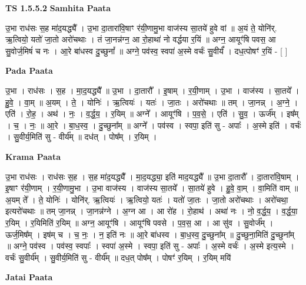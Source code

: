 \documentclass[17pt]{extarticle}
\begin{document}
\textbf{TS 1.5.5.2 } \newline
\textbf{Samhita Paata} \newline

उ॒भा राध॑सः स॒ह मा॑द॒यद्ध्यै᳚ । उ॒भा दा॒तारा॑वि॒षाꣳ र॑यी॒णामु॒भा वाज॑स्य सा॒तये॑ हुवे वां ॥ अ॒यं ते॒ योनि॑र्. ऋ॒त्वियो॒ यतो॑ जा॒तो अरो॑चथाः । तं जा॒नन्न॑ग्न॒ आ रो॒हाथा॑ नो वर्द्धया र॒यिं ॥ अग्न॒ आयूꣳ॑षि पवस॒ आ सु॒वोर्ज॒मिषं॑ च नः । आ॒रे बा॑धस्व दु॒च्छुनां᳚ ॥ अग्ने॒ पव॑स्व॒ स्वपा॑ अ॒स्मे वर्चः॑ सु॒वीर्यं᳚ । दध॒त्पोषꣳ॑ र॒यिं - [ ] \newline

\textbf{Pada Paata} \newline

उ॒भा । राध॑सः । स॒ह । मा॒द॒यद्ध्यै᳚ ॥ उ॒भा । दा॒तारौ᳚ । इ॒षाम् । र॒यी॒णाम् । उ॒भा । वाज॑स्य । सा॒तये᳚ । हु॒वे॒ । वा॒म् ॥ अ॒यम् । ते॒ । योनिः॑ । ऋ॒त्वियः॑ । यतः॑ । जा॒तः । अरो॑चथाः ॥ तम् । जा॒नन्न् । अ॒ग्ने॒ । एति॑ । रो॒ह॒ । अथ॑ । नः॒ । व॒र्द्ध॒य॒ । र॒यिम् ॥ अग्ने᳚ । आयूꣳ॑षि । प॒व॒से॒ । एति॑ । सु॒व॒ । ऊर्ज᳚म् । इष᳚म् । च॒ । नः॒ ॥ आ॒रे । बा॒ध॒स्व॒ । दु॒च्छुना᳚म् ॥ अग्ने᳚ । पव॑स्व । स्वपा॒ इति॑ सु - अपाः᳚ । अ॒स्मे इति॑ । वर्चः॑ । सु॒वीर्य॒मिति॑ सु - वीर्य᳚म् ॥ दध॑त् । पोष᳚म् । र॒यिम् ।  \newline


\textbf{Krama Paata} \newline

उ॒भा राध॑सः । राध॑सः स॒ह । स॒ह मा॑द॒यद्ध्यै᳚ । मा॒द॒यद्ध्या॒ इति॑ माद॒यद्ध्यै᳚ ॥ उ॒भा दा॒तारौ᳚ । दा॒तारा॑वि॒षाम् । इ॒षाꣳ र॑यी॒णाम् । र॒यी॒णामु॒भा । उ॒भा वाज॑स्य । वाज॑स्य सा॒तये᳚ । सा॒तये॑ हुवे । हु॒वे॒ वा॒म् । वा॒मिति॑ वाम् ॥ अ॒यम् ते᳚ । ते॒ योनिः॑ । योनि॑र्. ऋ॒त्वियः॑ । ऋ॒त्वियो॒ यतः॑ । यतो॑ जा॒तः । जा॒तो अरो॑चथाः । अरो॑चथा॒ इत्यरो॑चथाः ॥ तम् जा॒नन्न् । जा॒नन्न॑ग्ने । अ॒ग्न आ । आ रो॑ह । रो॒हाथ॑ । अथा॑ नः । नो॒ व॒र्द्ध॒य॒ । व॒र्द्ध॒या॒ र॒यिम् । र॒यिमिति॑ र॒यिम् ॥ अग्न॒ आयूꣳ॑षि । आयूꣳ॑षि पवसे । प॒व॒स॒ आ । आ सु॑व । सु॒वोर्ज᳚म् । ऊर्ज॒मिष᳚म् । इष॑म् च । च॒ नः॒ । न॒ इति॑ नः ॥ आ॒रे बा॑धस्व । बा॒ध॒स्व॒ दु॒च्छुना᳚म् ॥ दु॒च्छुना॒मिति॑ दु॒च्छुना᳚म् ॥ अग्ने॒ पव॑स्व । पव॑स्व॒ स्वपाः᳚ । स्वपा॑ अ॒स्मे । स्वपा॒ इति॑ सु - अपाः᳚ । अ॒स्मे वर्चः॑ । अ॒स्मे इत्य॒स्मे । वर्चः॑ सु॒वीर्य᳚म् । सु॒वीर्य॒मिति॑ सु - वीर्य᳚म् ॥ दध॒त् पोष᳚म् । पोषꣳ॑ र॒यिम् । र॒यिम् मयि॑ \newline

\textbf{Jatai Paata} \newline
\end{document}
